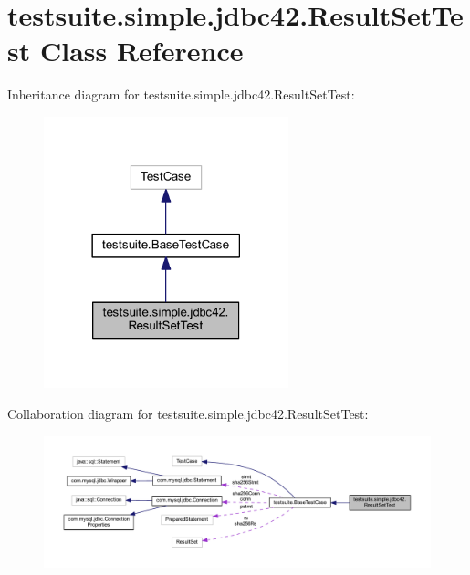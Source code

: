 \hypertarget{classtestsuite_1_1simple_1_1jdbc42_1_1_result_set_test}{}\section{testsuite.\+simple.\+jdbc42.\+Result\+Set\+Test Class Reference}
\label{classtestsuite_1_1simple_1_1jdbc42_1_1_result_set_test}


Inheritance diagram for testsuite.\+simple.\+jdbc42.\+Result\+Set\+Test\+:
\nopagebreak
\begin{figure}[H]
\begin{center}
\leavevmode
\includegraphics[width=201pt]{classtestsuite_1_1simple_1_1jdbc42_1_1_result_set_test__inherit__graph}
\end{center}
\end{figure}


Collaboration diagram for testsuite.\+simple.\+jdbc42.\+Result\+Set\+Test\+:
\nopagebreak
\begin{figure}[H]
\begin{center}
\leavevmode
\includegraphics[width=350pt]{classtestsuite_1_1simple_1_1jdbc42_1_1_result_set_test__coll__graph}
\end{center}
\end{figure}
